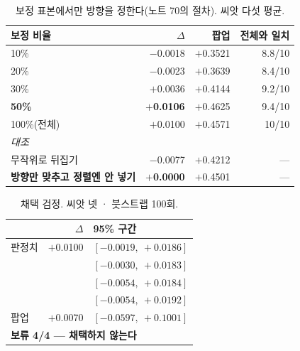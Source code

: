 \documentclass[10pt]{article}
\begin{document}
\begin{table}[t]
\centering\tsize
\caption{보정 표본에서만 방향을 정한다(노트 70의 절차). 씨앗 다섯 평균.}
\begin{tabular}{lrrr}
\toprule
보정 비율 & $\Delta$ & 팝업 & 전체와 일치 \\
\midrule
10\% & $-$0.0018 & $+$0.3521 & 8.8/10 \\
20\% & $-$0.0023 & $+$0.3639 & 8.4/10 \\
30\% & $+$0.0036 & $+$0.4144 & 9.2/10 \\
\textbf{50\%} & \textbf{$+$0.0106} & $+$0.4625 & 9.4/10 \\
100\%(전체) & $+$0.0100 & $+$0.4571 & 10/10 \\
\midrule
\multicolumn{2}{l}{\emph{대조}} & & \\
무작위로 뒤집기 & $-$0.0077 & $+$0.4212 & --- \\
\textbf{방향만 맞추고 정렬엔 안 넣기} & \textbf{$+$0.0000} & $+$0.4501 & --- \\
\bottomrule
\end{tabular}
\end{table}


\begin{table}[t]
\centering\tsize
\caption{채택 검정. 씨앗 넷 · 붓스트랩 100회.}
\begin{tabular}{lrl}
\toprule
& $\Delta$ & 95\% 구간 \\
\midrule
판정치 & $+$0.0100 & $[-0.0019,\ +0.0186]$ \\
& & $[-0.0030,\ +0.0183]$ \\
& & $[-0.0054,\ +0.0184]$ \\
& & $[-0.0054,\ +0.0192]$ \\
팝업 & $+$0.0070 & $[-0.0597,\ +0.1001]$ \\
\midrule
\multicolumn{3}{l}{\textbf{보류 4/4 --- 채택하지 않는다}} \\
\bottomrule
\end{tabular}
\end{table}

\end{document}
